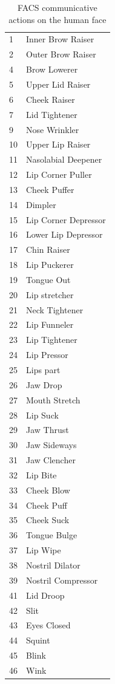 \documentclass[oneside,11pt]{memoir}
\begin{document}
\begin{table}[hpdf]
\begin{center}
\caption{FACS communicative actions on the human face}
\label{Tab:Table2}
\begin{tabular}{|l|l|}
\hline
1 & Inner Brow Raiser \\
2 & Outer Brow Raiser \\
4 & Brow Lowerer \\
5 & Upper Lid Raiser \\
6 & Cheek Raiser \\
7 & Lid Tightener \\
9 & Nose Wrinkler \\
10 & Upper Lip Raiser \\
11 & Nasolabial Deepener \\
12 & Lip Corner Puller \\
13 & Cheek Puffer \\
14 & Dimpler \\
15 & Lip Corner Depressor \\
16 & Lower Lip Depressor \\
17 & Chin Raiser \\
18 & Lip Puckerer \\
19 & Tongue Out \\
20 & Lip stretcher \\
21 & Neck Tightener \\
22 & Lip Funneler \\
23 & Lip Tightener \\
24 & Lip Pressor \\
25 & Lips part \\
26 & Jaw Drop \\
27 & Mouth Stretch \\
28 & Lip Suck \\
29 & Jaw Thrust \\
30 & Jaw Sideways \\
31 & Jaw Clencher \\
32 & Lip Bite \\
33 & Cheek Blow \\
34 & Cheek Puff \\
35 & Cheek Suck \\
36 & Tongue Bulge \\
37 & Lip Wipe \\
38 & Nostril Dilator \\
39 & Nostril Compressor \\
41 & Lid Droop \\
42 & Slit \\
43 & Eyes Closed \\
44 & Squint \\
45 & Blink \\
46 & Wink \\
\hline
\end{tabular}
\end{center}
\end{table}
\end{document}
